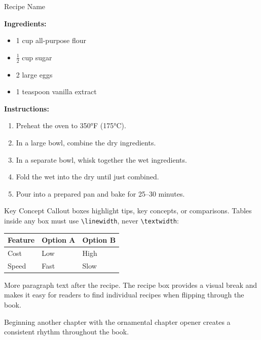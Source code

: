 \begin{recipebox}{Recipe Name}

\textbf{Ingredients:}
\begin{itemize}
  \item 1 cup all-purpose flour
  \item \(\frac{1}{2}\) cup sugar
  \item 2 large eggs
  \item 1 teaspoon vanilla extract
\end{itemize}

\textbf{Instructions:}
\begin{enumerate}
  \item Preheat the oven to 350°F (175°C).
  \item In a large bowl, combine the dry ingredients.
  \item In a separate bowl, whisk together the wet ingredients.
  \item Fold the wet into the dry until just combined.
  \item Pour into a prepared pan and bake for 25--30 minutes.
\end{enumerate}

\end{recipebox}


\begin{accentbox}{Key Concept}
Callout boxes highlight tips, key concepts, or comparisons. Tables inside
any box must use \texttt{\textbackslash linewidth}, never
\texttt{\textbackslash textwidth}:

\begin{tabularx}{\linewidth}{lXX}
\toprule
\textbf{Feature} & \textbf{Option A} & \textbf{Option B} \\
\midrule
Cost & Low & High \\
Speed & Fast & Slow \\
\bottomrule
\end{tabularx}
\end{accentbox}

\thinnerule

More paragraph text after the recipe. The recipe box provides a visual
break and makes it easy for readers to find individual recipes when
flipping through the book.

\clearpage


Beginning another chapter with the ornamental chapter opener creates a
consistent rhythm throughout the book.
